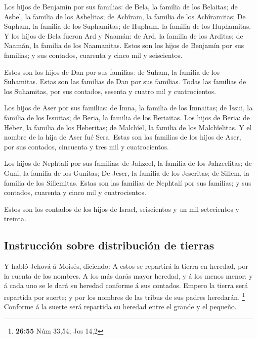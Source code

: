  Los hijos de Benjamín por sus familias: de Bela, la
familia de los Belaitas; de Asbel, la familia de los Asbelitas; de
Achîram, la familia de los Achîramitas;  De Supham, la
familia de los Suphamitas; de Hupham, la familia de los Huphamitas.
 Y los hijos de Bela fueron Ard y Naamán: de Ard, la
familia de los Arditas; de Naamán, la familia de los Naamanitas.
 Estos son los hijos de Benjamín por sus familias; y sus
contados, cuarenta y cinco mil y seiscientos.

 Estos son los hijos de Dan por sus familias: de Suham,
la familia de los Suhamitas. Estas son las familias de Dan por sus
familias.  Todas las familias de los Suhamitas, por sus
contados, sesenta y cuatro mil y cuatrocientos.

 Los hijos de Aser por sus familias: de Imna, la familia
de los Imnaitas; de Issui, la familia de los Issuitas; de Beria, la
familia de los Beriaitas.  Los hijos de Beria: de Heber,
la familia de los Heberitas; de Malchîel, la familia de los
Malchîelitas.  Y el nombre de la hija de Aser fué Sera.
 Estas son las familias de los hijos de Aser, por sus
contados, cincuenta y tres mil y cuatrocientos.

 Los hijos de Nephtalí por sus familias: de Jahzeel, la
familia de los Jahzeelitas; de Guni, la familia de los Gunitas;
 De Jeser, la familia de los Jeseritas; de Sillem, la
familia de los Sillemitas.  Estas son las familias de
Nephtalí por sus familias; y sus contados, cuarenta y cinco mil y
cuatrocientos.

 Estos son los contados de los hijos de Israel,
seiscientos y un mil setecientos y treinta.

\hypertarget{instrucciuxf3n-sobre-distribuciuxf3n-de-tierras}{%
\subsection{Instrucción sobre distribución de
tierras}\label{instrucciuxf3n-sobre-distribuciuxf3n-de-tierras}}

 Y habló Jehová á Moisés, diciendo:  A
estos se repartirá la tierra en heredad, por la cuenta de los nombres.
 A los más darás mayor heredad, y á los menos menor; y á
cada uno se le dará su heredad conforme á sus contados. 
Empero la tierra será repartida por suerte; y por los nombres de las
tribus de sus padres heredarán. \footnote{\textbf{26:55} Núm 33,54; Jos
  14,2}  Conforme á la suerte será repartida su heredad
entre el grande y el pequeño.

